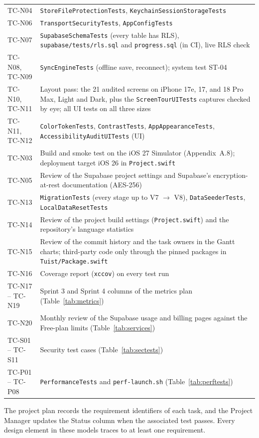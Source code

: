 \documentclass[12pt,letterpaper]{article}
\begin{document}
\begin{xltabular}{\textwidth}{@{}L{2.4cm} Y@{}}
TC-N04 & \texttt{StoreFileProtectionTests}, \texttt{KeychainSessionStorageTests} \\
TC-N06 & \texttt{TransportSecurityTests}, \texttt{AppConfigTests} \\
TC-N07 & \texttt{SupabaseSchemaTests} (every table has RLS), \texttt{supabase/tests/rls.sql} and \texttt{progress.sql} (in CI), live RLS check \\
TC-N08, TC-N09 & \texttt{SyncEngineTests} (offline save, reconnect); system test ST-04 \\
TC-N10, TC-N11 & Layout pass: the 21 audited screens on iPhone 17e, 17, and 18 Pro Max, Light and Dark, plus the \texttt{ScreenTourUITests} captures checked by eye; all UI tests on all three sizes \\
TC-N11, TC-N12 & \texttt{ColorTokenTests}, \texttt{ContrastTests}, \texttt{AppAppearanceTests}, \texttt{AccessibilityAuditUITests} (UI) \\
TC-N03 & Build and smoke test on the iOS 27 Simulator (Appendix~A.8); deployment target iOS 26 in \texttt{Project.swift} \\
TC-N05 & Review of the Supabase project settings and Supabase's encryption-at-rest documentation (AES-256) \\
TC-N13 & \texttt{MigrationTests} (every stage up to V7 $\to$ V8), \texttt{DataSeederTests}, \texttt{LocalDataResetTests} \\
TC-N14 & Review of the project build settings (\texttt{Project.swift}) and the repository's language statistics \\
TC-N15 & Review of the commit history and the task owners in the Gantt charts; third-party code only through the pinned packages in \texttt{Tuist/Package.swift} \\
TC-N16 & Coverage report (\texttt{xccov}) on every test run \\
TC-N17 -- TC-N19 & Sprint 3 and Sprint 4 columns of the metrics plan (Table~\ref{tab:metrics}) \\
TC-N20 & Monthly review of the Supabase usage and billing pages against the Free-plan limits (Table~\ref{tab:services}) \\
TC-S01 -- TC-S11 & Security test cases (Table~\ref{tab:sectests}) \\
TC-P01 -- TC-P08 & \texttt{PerformanceTests} and \texttt{perf-launch.sh} (Table~\ref{tab:perftests}) \\
\end{xltabular}

The project plan records the requirement identifiers of each task, and the Project
Manager updates the Status column when the associated test passes. Every design element
in these models traces to at least one requirement.
\end{document}
